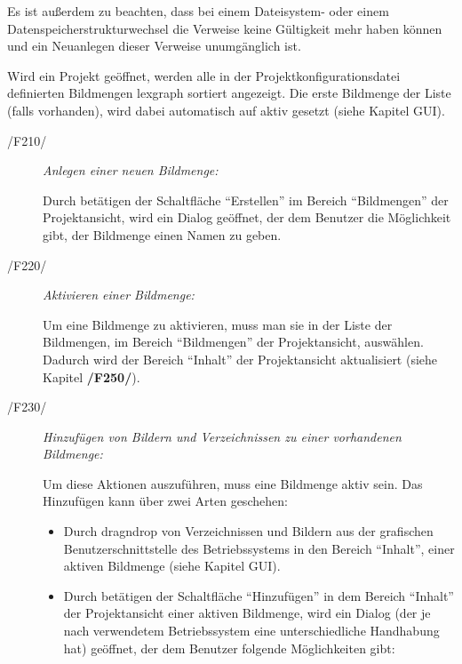 	Es ist außerdem zu beachten, dass bei einem Dateisystem- oder einem Datenspeicherstrukturwechsel die Verweise keine Gültigkeit mehr haben können und ein Neuanlegen dieser Verweise unumgänglich ist.\par Wird ein Projekt geöffnet, werden alle in der Projektkonfigurationsdatei definierten Bildmengen \gls{lexgraph} sortiert angezeigt. Die erste Bildmenge der Liste (falls vorhanden), wird dabei automatisch auf aktiv gesetzt (siehe Kapitel GUI).
	
	\begin{description}
		
		\item[/F210/] \textit{Anlegen einer neuen Bildmenge:}\par Durch betätigen der Schaltfläche "`Erstellen"' im Bereich "`Bildmengen"' der Projektansicht, wird ein Dialog geöffnet, der dem Benutzer die Möglichkeit gibt, der Bildmenge einen Namen zu geben.
		
		\item[/F220/] \textit{Aktivieren einer Bildmenge:}\par Um eine Bildmenge zu aktivieren, muss man sie in der Liste der Bildmengen, im Bereich "`Bildmengen"' der Projektansicht, auswählen. Dadurch wird der Bereich "`Inhalt"' der Projektansicht aktualisiert (siehe Kapitel \textbf{/F250/}).
		
		\item[/F230/] \textit{Hinzufügen von Bildern und Verzeichnissen zu einer vorhandenen Bildmenge:}\par Um diese Aktionen auszuführen, muss eine Bildmenge aktiv sein. Das Hinzufügen kann über zwei Arten geschehen:
		
			\begin{itemize}
				
				\item Durch \gls{dragndrop} von Verzeichnissen und Bildern aus der grafischen Benutzerschnittstelle des Betriebssystems in den Bereich "`Inhalt"', einer aktiven Bildmenge (siehe Kapitel GUI). 
				
				\item Durch betätigen der Schaltfläche "`Hinzufügen"' in dem Bereich "`Inhalt"' der Projektansicht einer aktiven Bildmenge, wird ein Dialog (der je nach verwendetem Betriebssystem eine unterschiedliche Handhabung hat) geöffnet, der dem Benutzer folgende Möglichkeiten gibt:
				
					\begin{itemize}
			

\end{itemize}
\end{itemize}
\end{description}

